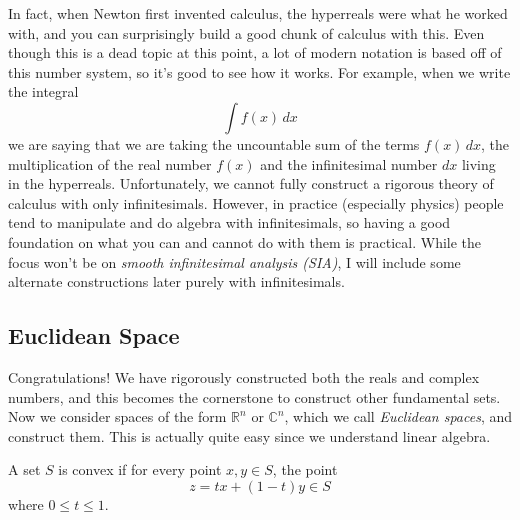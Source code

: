   In fact, when Newton first invented calculus, the hyperreals were what he worked with, and you can surprisingly build a good chunk of calculus with this. Even though this is a dead topic at this point, a lot of modern notation is based off of this number system, so it's good to see how it works. For example, when we write the integral 
  \begin{equation}
    \int f(x) \,dx
  \end{equation} 
  we are saying that we are taking the uncountable sum of the terms $f(x) \,dx$, the multiplication of the real number $f(x)$ and the infinitesimal number $dx$ living in the hyperreals. Unfortunately, we cannot fully construct a rigorous theory of calculus with only infinitesimals. However, in practice (especially physics) people tend to manipulate and do algebra with infinitesimals, so having a good foundation on what you can and cannot do with them is practical. While the focus won't be on \textit{smooth infinitesimal analysis (SIA)}, I will include some alternate constructions later purely with infinitesimals. 

\subsection{Euclidean Space} 

  Congratulations! We have rigorously constructed both the reals and complex numbers, and this becomes the cornerstone to construct other fundamental sets. Now we consider spaces of the form $\mathbb{R}^n$ or $\mathbb{C}^n$, which we call \textit{Euclidean spaces}, and construct them. This is actually quite easy since we understand linear algebra. 

  \begin{definition}
    A set $S$ is convex if for every point $x, y \in S$, the point 
    \begin{equation}
      z = t x + (1 - t) y \in S
    \end{equation}
    where $0 \leq t \leq 1$. 
  \end{definition}

